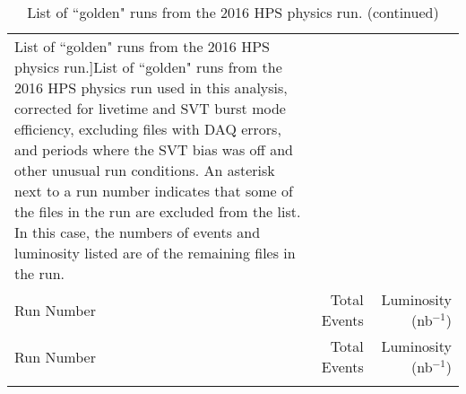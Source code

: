\documentclass[11pt]{article}
\begin{document}
\begin{longtable}[!hbtp]{l r r}


\caption[List of ``golden" runs from the 2016 HPS physics run.]{List of ``golden" runs from the 2016 HPS physics run used in this analysis, corrected for livetime and SVT burst mode efficiency, excluding files with DAQ errors, and periods where the SVT bias was off and other unusual run conditions.  An asterisk next to a run number indicates that some of the files in the run are excluded from the list.  In this case, the numbers of events and luminosity listed are of the remaining files in the run.} \\
\label{tbl:runs_used}
  \hline
  Run Number & Total Events  &	Luminosity (nb$^{-1}$) \\
  \hline
\endfirsthead
\caption{List of ``golden" runs from the 2016 HPS physics run. (continued)}
  \hline
  Run Number & Total Events  &	Luminosity (nb$^{-1}$) \\
  \hline
\endhead
\hline


\endfoot


\end{longtable}
\end{document}
